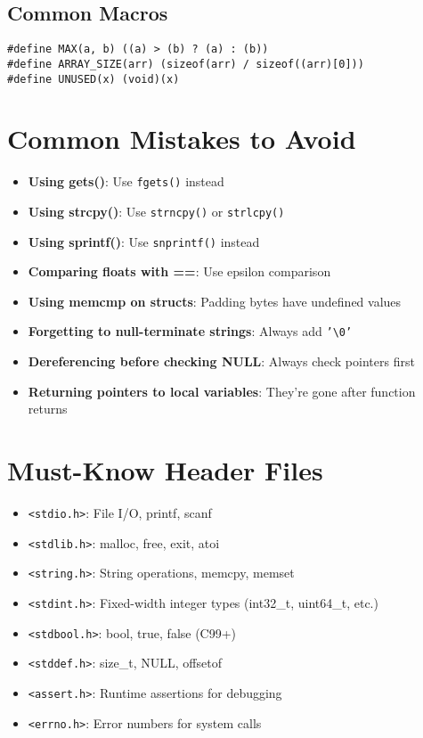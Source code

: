 \documentclass[11pt,openany]{book}
\begin{document}
\subsection*{Common Macros}
\begin{lstlisting}
#define MAX(a, b) ((a) > (b) ? (a) : (b))
#define ARRAY_SIZE(arr) (sizeof(arr) / sizeof((arr)[0]))
#define UNUSED(x) (void)(x)
\end{lstlisting}

\section*{Common Mistakes to Avoid}

\begin{itemize}
    \item \textbf{Using gets()}: Use \texttt{fgets()} instead
    \item \textbf{Using strcpy()}: Use \texttt{strncpy()} or \texttt{strlcpy()}
    \item \textbf{Using sprintf()}: Use \texttt{snprintf()} instead
    \item \textbf{Comparing floats with ==}: Use epsilon comparison
    \item \textbf{Using memcmp on structs}: Padding bytes have undefined values
    \item \textbf{Forgetting to null-terminate strings}: Always add \texttt{'\textbackslash 0'}
    \item \textbf{Dereferencing before checking NULL}: Always check pointers first
    \item \textbf{Returning pointers to local variables}: They're gone after function returns
\end{itemize}

\section*{Must-Know Header Files}

\begin{itemize}
    \item \texttt{<stdio.h>}: File I/O, printf, scanf
    \item \texttt{<stdlib.h>}: malloc, free, exit, atoi
    \item \texttt{<string.h>}: String operations, memcpy, memset
    \item \texttt{<stdint.h>}: Fixed-width integer types (int32\_t, uint64\_t, etc.)
    \item \texttt{<stdbool.h>}: bool, true, false (C99+)
    \item \texttt{<stddef.h>}: size\_t, NULL, offsetof
    \item \texttt{<assert.h>}: Runtime assertions for debugging
    \item \texttt{<errno.h>}: Error numbers for system calls
\end{itemize}
\end{document}
